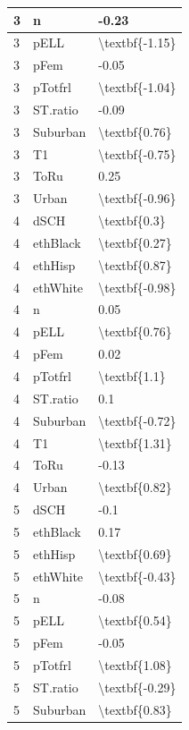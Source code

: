 \documentclass[man,floatsintext]{apa6}
\begin{document}
\begin{table}[H]
\begin{tabular}{l|l|l}
\hline
3 & n & -0.23\\
\hline
3 & pELL & \textbackslash{}textbf\{-1.15\}\\
\hline
3 & pFem & -0.05\\
\hline
3 & pTotfrl & \textbackslash{}textbf\{-1.04\}\\
\hline
3 & ST.ratio & -0.09\\
\hline
3 & Suburban & \textbackslash{}textbf\{0.76\}\\
\hline
3 & T1 & \textbackslash{}textbf\{-0.75\}\\
\hline
3 & ToRu & 0.25\\
\hline
3 & Urban & \textbackslash{}textbf\{-0.96\}\\
\hline
4 & dSCH & \textbackslash{}textbf\{0.3\}\\
\hline
4 & ethBlack & \textbackslash{}textbf\{0.27\}\\
\hline
4 & ethHisp & \textbackslash{}textbf\{0.87\}\\
\hline
4 & ethWhite & \textbackslash{}textbf\{-0.98\}\\
\hline
4 & n & 0.05\\
\hline
4 & pELL & \textbackslash{}textbf\{0.76\}\\
\hline
4 & pFem & 0.02\\
\hline
4 & pTotfrl & \textbackslash{}textbf\{1.1\}\\
\hline
4 & ST.ratio & 0.1\\
\hline
4 & Suburban & \textbackslash{}textbf\{-0.72\}\\
\hline
4 & T1 & \textbackslash{}textbf\{1.31\}\\
\hline
4 & ToRu & -0.13\\
\hline
4 & Urban & \textbackslash{}textbf\{0.82\}\\
\hline
5 & dSCH & -0.1\\
\hline
5 & ethBlack & 0.17\\
\hline
5 & ethHisp & \textbackslash{}textbf\{0.69\}\\
\hline
5 & ethWhite & \textbackslash{}textbf\{-0.43\}\\
\hline
5 & n & -0.08\\
\hline
5 & pELL & \textbackslash{}textbf\{0.54\}\\
\hline
5 & pFem & -0.05\\
\hline
5 & pTotfrl & \textbackslash{}textbf\{1.08\}\\
\hline
5 & ST.ratio & \textbackslash{}textbf\{-0.29\}\\
\hline
5 & Suburban & \textbackslash{}textbf\{0.83\}\\

\end{tabular}
\end{table}
\end{document}
